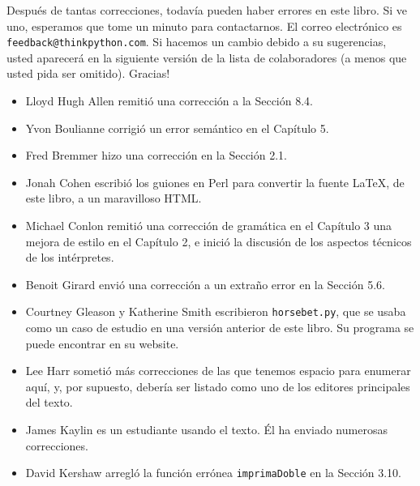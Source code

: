 Después de tantas correcciones, todavía pueden haber errores en este
libro. Si ve uno, esperamos que tome un minuto para contactarnos.
El correo electrónico es \texttt{feedback@thinkpython.com}. Si hacemos
un cambio debido a su sugerencias, usted aparecerá en la siguiente
versión de la lista de colaboradores (a menos que usted pida ser omitido).
Gracias!
\begin{itemize}
\item Lloyd Hugh Allen remitió una corrección a la Sección 8.4. %
\item Yvon Boulianne corrigió un error semántico en el Capítulo 5. %
\item Fred Bremmer hizo una corrección en la Sección 2.1. %
\item Jonah Cohen escribió los guiones en Perl para convertir la fuente
LaTeX, de este libro, a un maravilloso HTML.

\item Michael Conlon remitió una corrección de gramática en el Capítulo
3 una mejora de estilo en el Capítulo 2, e inició la discusión de
los aspectos técnicos de los intérpretes.

\item Benoit Girard envió una corrección a un extraño error en la Sección
5.6.

\item Courtney Gleason y Katherine Smith escribieron \texttt{horsebet.py},
que se usaba como un caso de estudio en una versión anterior de este
libro. Su programa se puede encontrar en su website.

\item Lee Harr sometió más correcciones de las que tenemos espacio para
enumerar aquí, y, por supuesto, debería ser listado como uno de los
editores principales del texto.

\item James Kaylin es un estudiante usando el texto. Él ha enviado numerosas
correcciones.

\item David Kershaw arregló la función errónea \texttt{imprimaDoble} en
la Sección 3.10.


\end{itemize}
